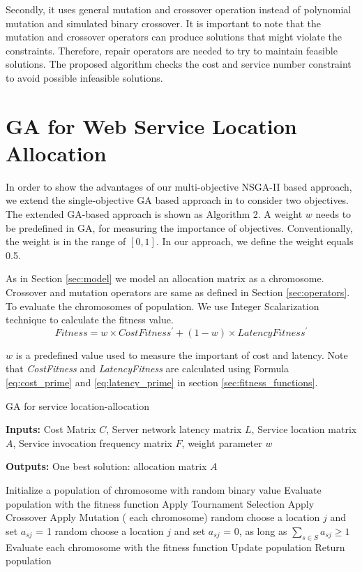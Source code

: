 \documentclass{llncs}
\begin{document}
Secondly, it uses general mutation and crossover operation instead of polynomial mutation and simulated binary crossover.
It is important to note that the mutation and crossover operators can produce solutions that might violate the constraints. 
Therefore, repair operators are needed to try to maintain feasible solutions. The proposed algorithm checks the cost and service number constraint to avoid
possible infeasible solutions.

\section{GA for Web Service Location Allocation}
\label{sec:GA}

In order to show the advantages of our multi-objective NSGA-II based approach, we extend the single-objective GA based approach in \cite{Huang} to consider two objectives. 
The extended GA-based approach is shown as Algorithm 2. A weight $w$ needs to be predefined in GA, for 
measuring the importance of objectives. Conventionally, the weight is in the range of $[0, 1]$. In our approach, we define the weight equals 0.5.

As in Section \ref{sec:model} we model an allocation matrix as a chromosome. Crossover and mutation operators are same as defined in Section \ref{sec:operators}.
To evaluate the chromosomes of population.
We use Integer Scalarization technique to calculate the fitness value. 
\begin{equation}
		Fitness = w \times CostFitness^\prime + (1 - w) \times LatencyFitness^\prime
	\end{equation}

	$w$ is a predefined value used to measure the important of cost and latency. Note that \emph{CostFitness} and \emph{LatencyFitness}
	are calculated using Formula \ref{eq:cost_prime} and \ref{eq:latency_prime} in section \ref{sec:fitness_functions}.


\begin{algorithm}[htb]
	\caption{GA for service location-allocation}
	\textbf{Inputs:}
		Cost Matrix $C$,
		Server network latency matrix $L$, 
		Service location matrix $A$, 
		Service invocation frequency matrix $F$, 
		weight parameter $w$

	\textbf{Outputs:}
		One best solution: allocation matrix $A$


	\begin{algorithmic}[1]
		\State Initialize a population of chromosome with random binary value
		\State Evaluate population with the fitness function
			\State Apply Tournament Selection
			\State Apply Crossover 
			\State Apply Mutation
			\For( each chromosome)
					\State random choose a location $j$ and set $a_{sj}$ = 1
				\EndWhile
					\State random choose a location $j$ and set $a_{sj}$ = 0, as long as $\sum\limits_{s \in S} a_{sj} \geq 1$
				\EndWhile
			\State Evaluate each chromosome with the fitness function
			\EndFor
			\State Update population
			\EndWhile
		\State Return population
	\end{algorithmic}
\end{algorithm}
\end{document}
